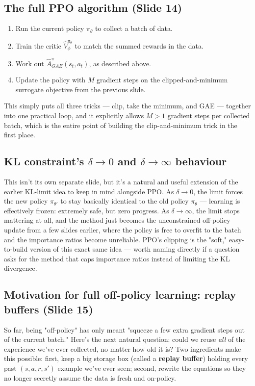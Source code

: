 \documentclass[11pt]{article}
\begin{document}
\subsection{The full PPO algorithm (Slide 14)}
\begin{enumerate}[leftmargin=*]
  \item Run the current policy $\pi_\theta$ to collect a batch of data.
  \item Train the critic $\hat V^{\pi_\theta}_\phi$ to match the summed rewards in the data.
  \item Work out $\hat A^\pi_{GAE}(s_t,a_t)$, as described above.
  \item Update the policy with $M$ gradient steps on the clipped-and-minimum surrogate objective from the previous slide.
\end{enumerate}
This simply puts all three tricks --- clip, take the minimum, and GAE --- together into one practical loop, and it explicitly allows $M>1$ gradient steps per collected batch, which is the entire point of building the clip-and-minimum trick in the first place.

\subsection{KL constraint's $\delta \to 0$ and $\delta \to \infty$ behaviour}
This isn't its own separate slide, but it's a natural and useful extension of the earlier KL-limit idea to keep in mind alongside PPO. As $\delta \to 0$, the limit forces the new policy $\pi_{\theta'}$ to stay basically identical to the old policy $\pi_\theta$ --- learning is effectively frozen: extremely safe, but zero progress. As $\delta \to \infty$, the limit stops mattering at all, and the method just becomes the unconstrained off-policy update from a few slides earlier, where the policy is free to overfit to the batch and the importance ratios become unreliable. PPO's clipping is the "soft," easy-to-build version of this exact same idea --- worth naming directly if a question asks for the method that caps importance ratios instead of limiting the KL divergence.

\subsection{Motivation for full off-policy learning: replay buffers (Slide 15)}
So far, being "off-policy" has only meant "squeeze a few extra gradient steps out of the current batch." Here's the next natural question: could we reuse \emph{all} of the experience we've ever collected, no matter how old it is? Two ingredients make this possible: first, keep a big storage box (called a \textbf{replay buffer}) holding every past $(s,a,r,s')$ example we've ever seen; second, rewrite the equations so they no longer secretly assume the data is fresh and on-policy.
\end{document}
